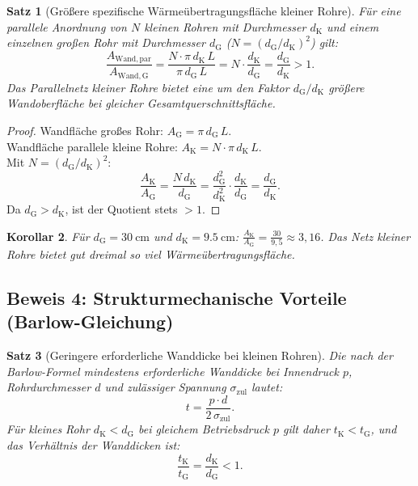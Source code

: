 ﻿\documentclass[12pt,a4paper,twoside]{article}
\theoremstyle{plain}
\newtheorem{theorem}{Satz}[section]
\newtheorem{corollary}[theorem]{Korollar}
\theoremstyle{definition}
\theoremstyle{remark}
\newcommand{\dG}{d_{\mathrm{G}}}
\newcommand{\dK}{d_{\mathrm{K}}}
\begin{document}
\begin{theorem}[Größere spezifische Wärmeübertragungsfläche kleiner Rohre]
\label{thm:waermeflaeche}
Für eine parallele Anordnung von $N$ kleinen Rohren mit Durchmesser $\dK$
und einem einzelnen großen Rohr mit Durchmesser $\dG$ ($N = (\dG/\dK)^2$)
gilt:
\begin{equation}
  \frac{A_{\mathrm{Wand,par}}}{A_{\mathrm{Wand,G}}}
    = \frac{N \cdot \pi\,\dK\,L}{\pi\,\dG\,L}
    = N \cdot \frac{\dK}{\dG}
    = \frac{\dG}{\dK} > 1.
  \label{eq:waermeflaeche}
\end{equation}
Das Parallelnetz kleiner Rohre bietet eine um den Faktor $\dG/\dK$
größere Wandoberfläche bei gleicher Gesamtquerschnittsfläche.
\end{theorem}

\begin{proof}
  Wandfläche großes Rohr: $A_{\mathrm{G}} = \pi\,\dG\,L$.\\
  Wandfläche parallele kleine Rohre: $A_{\mathrm{K}} = N \cdot \pi\,\dK\,L$.\\
  Mit $N = (\dG/\dK)^2$:
  \begin{equation}
    \frac{A_{\mathrm{K}}}{A_{\mathrm{G}}}
      = \frac{N\,\dK}{\dG}
      = \frac{\dG^2}{\dK^2} \cdot \frac{\dK}{\dG}
      = \frac{\dG}{\dK}.
  \end{equation}
  Da $\dG > \dK$, ist der Quotient stets $> 1$.
\end{proof}

\begin{corollary}
\label{cor:waermeflaeche}
Für $\dG = \SI{30}{\centi\metre}$ und $\dK = \SI{9.5}{\centi\metre}$:
$\frac{A_{\mathrm{K}}}{A_{\mathrm{G}}} = \frac{30}{9{,}5} \approx 3{,}16$.
Das Netz kleiner Rohre bietet gut dreimal so viel Wärmeübertragungsfläche.
\end{corollary}

\subsection{Beweis 4: Strukturmechanische Vorteile (Barlow-Gleichung)}
\label{ssec:beweis_barlow}

\begin{theorem}[Geringere erforderliche Wanddicke bei kleinen Rohren]
\label{thm:barlow}
Die nach der Barlow-Formel mindestens erforderliche Wanddicke bei
Innendruck $p$, Rohrdurchmesser $d$ und zulässiger Spannung
$\sigma_{\mathrm{zul}}$ lautet:
\begin{equation}
  t = \frac{p \cdot d}{2\,\sigma_{\mathrm{zul}}}.
  \label{eq:barlow}
\end{equation}
Für kleines Rohr $\dK < \dG$ bei gleichem Betriebsdruck $p$ gilt daher
$t_{\mathrm{K}} < t_{\mathrm{G}}$, und das Verhältnis der Wanddicken ist:
\begin{equation}
  \frac{t_{\mathrm{K}}}{t_{\mathrm{G}}} = \frac{\dK}{\dG} < 1.
  \label{eq:wanddicke_verhaltnis}
\end{equation}
\end{theorem}
\end{document}
